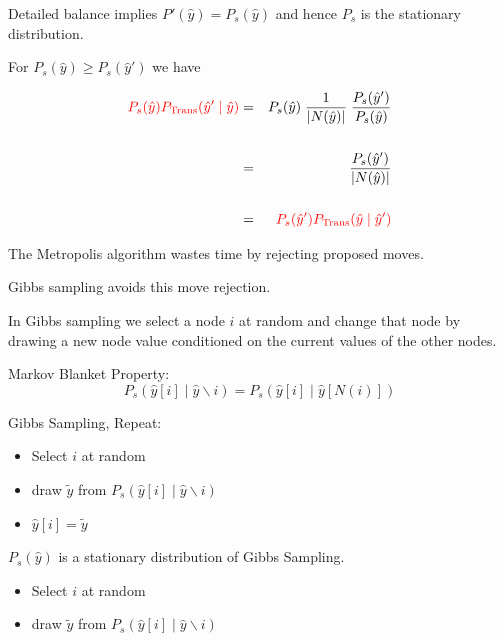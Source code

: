 {\vfill
Detailed balance implies {\color{red} $P'(\hat{y}) = P_s(\hat{y})$} and hence $P_s$ is the stationary distribution.


For $P_s(\hat{y}) \geq P_s(\hat{y}')$ we have

\begin{eqnarray*}
{\color{red} P_s(\hat{y})P_{\mathrm{Trans}}(\hat{y}'\;|\;\hat{y})} & = & P_s(\hat{y})\;\frac{1}{|N(\hat{y})|}\;\frac{P_s(\hat{y}')}{P_s(\hat{y})} \\
\\
& = & \frac{P_s(\hat{y}')}{|N(\hat{y})|} \\
\\
& = & {\color{red} P_s(\hat{y}')P_{\mathrm{Trans}}(\hat{y}\;|\;\hat{y}')}
\end{eqnarray*}


The Metropolis algorithm wastes time by rejecting proposed moves.

\vfill
Gibbs sampling avoids this move rejection.

\vfill
In Gibbs sampling we select a node $i$ at random and change that node by drawing a new node value conditioned on the current values of the other nodes.


Markov Blanket Property:
$$P_s(\hat{y}[i] \;|\;\hat{y} \backslash i) = P_s(\hat{y}[i] \;|\; \hat{y}[N(i)])$$
  
\vfill
Gibbs Sampling, Repeat:

\begin{itemize}
\item   Select $i$ at random

\item draw $\tilde{y}$ from $P_s(\hat{y}[i] \;|\;\hat{y} \backslash i)$

\item $\hat{y}[i] = \tilde{y}$
\end{itemize}


$P_s(\hat{y})$ is a stationary distribution of Gibbs Sampling.

\vfill
\begin{itemize}
\item   Select $i$ at random

\item draw $\tilde{y}$ from $P_s(\hat{y}[i] \;|\;\hat{y} \backslash i)$


\end{itemize}}
